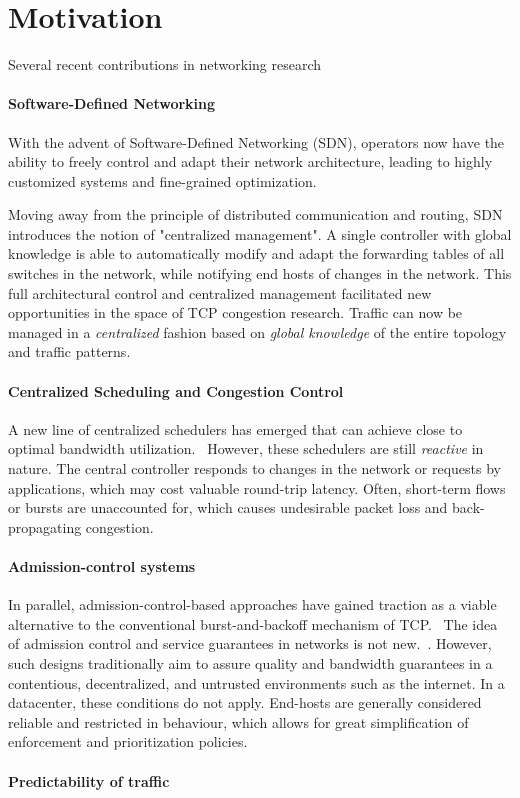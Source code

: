 \section{Motivation}
\label{sec:motivation}
Several recent contributions in networking research 

\paragraph{Software-Defined Networking}
With the advent of Software-Defined Networking (SDN), operators now have the 
ability to freely control and adapt their network architecture, leading to 
highly customized systems and fine-grained optimization.~\cite{sdn_road}

Moving away from the principle of distributed communication and routing, SDN 
introduces the notion of "centralized management". A single controller with 
global knowledge is able to automatically modify and adapt the forwarding 
tables of all switches in the network, while notifying end hosts of changes in 
the network.
This full architectural control and centralized management facilitated new 
opportunities in the space of TCP congestion research. Traffic can now be 
managed in a  \textit{centralized} fashion based on \textit{global knowledge} 
of the entire topology and traffic patterns.

\paragraph{Centralized Scheduling and Congestion Control}
A new line of centralized schedulers has emerged that can achieve close to 
optimal bandwidth utilization.~\cite{hedera, fastpass, microte, b4, dionysus}
However, these schedulers are still  \textit{reactive}  in nature. The central 
controller responds to changes in the network or requests by applications, 
which may cost valuable round-trip latency. Often, short-term flows or bursts 
are unaccounted for, which causes undesirable packet loss and back-propagating 
congestion.

\paragraph{Admission-control systems}
In parallel, admission-control-based approaches have gained traction as a 
viable alternative to the conventional burst-and-backoff mechanism of 
TCP.~\cite{expresspass, fastpass, perc}
The idea of admission control and service guarantees in networks is not 
new.~\cite{access_limit, access_limit2}. However, such designs traditionally 
aim to assure quality and bandwidth guarantees in a contentious, decentralized, 
and untrusted environments such as the internet. In a datacenter, these 
conditions do not apply. End-hosts are generally considered reliable and 
restricted in behaviour, which allows for great simplification of enforcement 
and prioritization policies.

\paragraph{Predictability of traffic}
